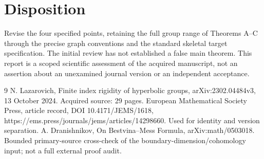 \documentclass[10pt]{article}
\begin{document}
\section*{Disposition}
Revise the four specified points, retaining the full group range of Theorems A–C through the precise graph conventions and the standard skeletal target specification. The initial review has not established a false main theorem. This report is a scoped scientific assessment of the acquired manuscript, not an assertion about an unexamined journal version or an independent acceptance.\par
9 N. Lazarovich, Finite index rigidity of hyperbolic groups, arXiv:2302.04484v3, 13 October 2024. Acquired source: 29 pages. European Mathematical Society Press, article record, DOI 10.4171/JEMS/1618, https://ems.press/journals/jems/articles/14298660. Used for identity and version separation. A. Dranishnikov, On Bestvina–Mess Formula, arXiv:math/0503018. Bounded primary-source cross-check of the boundary-dimension/cohomology input; not a full external proof audit.\par
\end{document}

